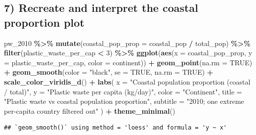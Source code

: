 \documentclass[
]{article}
\newenvironment{Shaded}{\begin{snugshade}}{\end{snugshade}}
\newcommand{\AttributeTok}[1]{\textcolor[rgb]{0.13,0.29,0.53}{#1}}
\newcommand{\ConstantTok}[1]{\textcolor[rgb]{0.56,0.35,0.01}{#1}}
\newcommand{\DecValTok}[1]{\textcolor[rgb]{0.00,0.00,0.81}{#1}}
\newcommand{\FunctionTok}[1]{\textcolor[rgb]{0.13,0.29,0.53}{\textbf{#1}}}
\newcommand{\NormalTok}[1]{#1}
\newcommand{\SpecialCharTok}[1]{\textcolor[rgb]{0.81,0.36,0.00}{\textbf{#1}}}
\newcommand{\StringTok}[1]{\textcolor[rgb]{0.31,0.60,0.02}{#1}}
\begin{document}
\subsection{7) Recreate and interpret the coastal proportion
plot}\label{recreate-and-interpret-the-coastal-proportion-plot}

\begin{Shaded}
\begin{Highlighting}[]
\NormalTok{pw\_2010 }\SpecialCharTok{\%\textgreater{}\%}
  \FunctionTok{mutate}\NormalTok{(}\AttributeTok{coastal\_pop\_prop =}\NormalTok{ coastal\_pop }\SpecialCharTok{/}\NormalTok{ total\_pop) }\SpecialCharTok{\%\textgreater{}\%}
  \FunctionTok{filter}\NormalTok{(plastic\_waste\_per\_cap }\SpecialCharTok{\textless{}} \DecValTok{3}\NormalTok{) }\SpecialCharTok{\%\textgreater{}\%}
  \FunctionTok{ggplot}\NormalTok{(}\FunctionTok{aes}\NormalTok{(}\AttributeTok{x =}\NormalTok{ coastal\_pop\_prop, }\AttributeTok{y =}\NormalTok{ plastic\_waste\_per\_cap, }\AttributeTok{color =}\NormalTok{ continent)) }\SpecialCharTok{+}
  \FunctionTok{geom\_point}\NormalTok{(}\AttributeTok{na.rm =} \ConstantTok{TRUE}\NormalTok{) }\SpecialCharTok{+}
  \FunctionTok{geom\_smooth}\NormalTok{(}\AttributeTok{color =} \StringTok{"black"}\NormalTok{, }\AttributeTok{se =} \ConstantTok{TRUE}\NormalTok{, }\AttributeTok{na.rm =} \ConstantTok{TRUE}\NormalTok{) }\SpecialCharTok{+}
  \FunctionTok{scale\_color\_viridis\_d}\NormalTok{() }\SpecialCharTok{+}
  \FunctionTok{labs}\NormalTok{(}
    \AttributeTok{x =} \StringTok{"Coastal population proportion (coastal / total)"}\NormalTok{,}
    \AttributeTok{y =} \StringTok{"Plastic waste per capita (kg/day)"}\NormalTok{,}
    \AttributeTok{color =} \StringTok{"Continent"}\NormalTok{,}
    \AttributeTok{title =} \StringTok{"Plastic waste vs coastal population proportion"}\NormalTok{,}
    \AttributeTok{subtitle =} \StringTok{"2010; one extreme per{-}capita country filtered out"}
\NormalTok{  ) }\SpecialCharTok{+}
  \FunctionTok{theme\_minimal}\NormalTok{()}
\end{Highlighting}
\end{Shaded}

\begin{verbatim}
## `geom_smooth()` using method = 'loess' and formula = 'y ~ x'
\end{verbatim}
\end{document}
